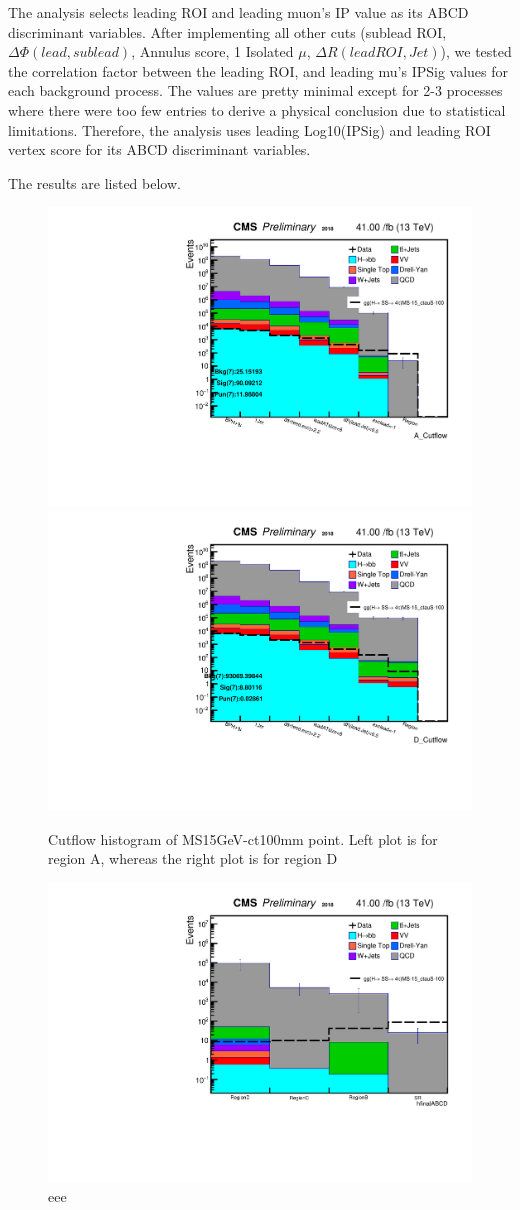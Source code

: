 The analysis selects leading ROI and leading muon's IP value as its ABCD discriminant variables.
After implementing all other cuts (sublead ROI, $\Delta\Phi(lead,sublead)$, Annulus score, 1 Isolated $\mu$, $\Delta R(lead ROI, Jet)$), we tested the correlation factor between the leading ROI, and leading mu's IPSig values for each background process.
The values are pretty minimal except for 2-3 processes where there were too few entries to derive a physical conclusion due to statistical limitations.
Therefore, the analysis uses leading Log10(IPSig) and leading ROI vertex score for its ABCD discriminant variables.

The results are listed below.  


 \begin{figure}[h!]
   \caption{Cutflow histogram of MS15GeV-ct100mm point. Left plot is for region A, whereas the right plot is for region D}
   \label{fig:ABmethod}
   \centering
   \includegraphics[width=0.47\linewidth]{figs/AnalysisNoteplot_MS-15_ctauS-100_A_Cutflow.pdf}
   \includegraphics[width=0.47\linewidth]{figs/AnalysisNoteplot_MS-15_ctauS-100_D_Cutflow.pdf}
 \end{figure}

 \begin{figure}[h!]
   \caption{eee}
   \label{fig:ABCDmethod}
   \centering
   \includegraphics[width=0.67\linewidth]{figs/AnalysisNoteplot_MS-15_ctauS-100_hfinalABCD.pdf}
 \end{figure}

